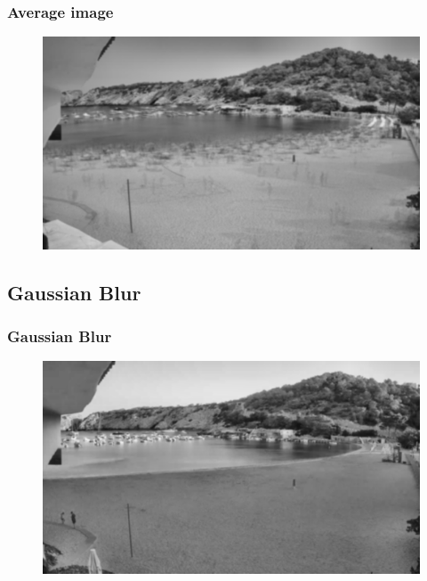 \documentclass{beamer}
\begin{document}
\begin{frame}
    \frametitle{Average image }

    \begin{figure}
        \centering
        \includegraphics[width=\textwidth]{../gen/avg.png}
    \end{figure}
    
\end{frame}

\subsection*{Gaussian Blur}
\begin{frame}
    \frametitle{Gaussian Blur}
    \begin{figure}
        \centering
        \includegraphics[width=\textwidth]{../gen/blur.png}
    \end{figure}

\end{frame}
\end{document}
